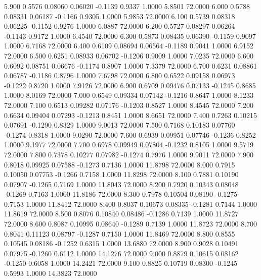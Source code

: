    5.900   0.5576   0.08060   0.06020  -0.1139   0.9337   1.0000   5.8501  72.0000
   6.000   0.5788   0.08331   0.06187  -0.1166   0.9305   1.0000   5.9853  72.0000
   6.100   0.5739   0.08318   0.06225  -0.1152   0.9276   1.0000   6.0887  72.0000
   6.200   0.5727   0.08297   0.06264  -0.1143   0.9172   1.0000   6.4540  72.0000
   6.300   0.5873   0.08435   0.06390  -0.1159   0.9097   1.0000   6.7168  72.0000
   6.400   0.6109   0.08694   0.06564  -0.1189   0.9041   1.0000   6.9152  72.0000
   6.500   0.6251   0.08933   0.06702  -0.1206   0.9009   1.0000   7.0235  72.0000
   6.600   0.6092   0.08751   0.06676  -0.1174   0.8907   1.0000   7.3379  72.0000
   6.700   0.6231   0.08861   0.06787  -0.1186   0.8796   1.0000   7.6798  72.0000
   6.800   0.6522   0.09158   0.06973  -0.1222   0.8720   1.0000   7.9126  72.0000
   6.900   0.6709   0.09476   0.07133  -0.1245   0.8685   1.0000   8.0169  72.0000
   7.000   0.6549   0.09334   0.07142  -0.1216   0.8647   1.0000   8.1233  72.0000
   7.100   0.6513   0.09282   0.07176  -0.1203   0.8527   1.0000   8.4545  72.0000
   7.200   0.6634   0.09404   0.07293  -0.1213   0.8451   1.0000   8.6651  72.0000
   7.400   0.7263   0.10215   0.07691  -0.1290   0.8329   1.0000   9.0013  72.0000
   7.500   0.7168   0.10183   0.07760  -0.1274   0.8318   1.0000   9.0290  72.0000
   7.600   0.6939   0.09951   0.07746  -0.1236   0.8252   1.0000   9.1977  72.0000
   7.700   0.6978   0.09949   0.07804  -0.1232   0.8105   1.0000   9.5719  72.0000
   7.800   0.7378   0.10277   0.07982  -0.1274   0.7976   1.0000   9.9011  72.0000
   7.900   0.8018   0.09925   0.07588  -0.1273   0.7136   1.0000  11.8798  72.0000
   8.000   0.7915   0.10050   0.07753  -0.1266   0.7158   1.0000  11.8298  72.0000
   8.100   0.7881   0.10190   0.07907  -0.1265   0.7169   1.0000  11.8043  72.0000
   8.200   0.7920   0.10343   0.08048  -0.1269   0.7163   1.0000  11.8186  72.0000
   8.300   0.7978   0.10504   0.08190  -0.1275   0.7153   1.0000  11.8412  72.0000
   8.400   0.8037   0.10673   0.08335  -0.1281   0.7144   1.0000  11.8619  72.0000
   8.500   0.8076   0.10840   0.08486  -0.1286   0.7139   1.0000  11.8727  72.0000
   8.600   0.8087   0.10995   0.08640  -0.1289   0.7139   1.0000  11.8723  72.0000
   8.700   0.8041   0.11123   0.08797  -0.1287   0.7150   1.0000  11.8469  72.0000
   8.800   0.8555   0.10545   0.08186  -0.1252   0.6315   1.0000  13.6880  72.0000
   8.900   0.9028   0.10491   0.07975  -0.1260   0.6112   1.0000  14.1276  72.0000
   9.000   0.8879   0.10615   0.08162  -0.1250   0.6058   1.0000  14.2421  72.0000
   9.100   0.8825   0.10719   0.08300  -0.1245   0.5993   1.0000  14.3823  72.0000

